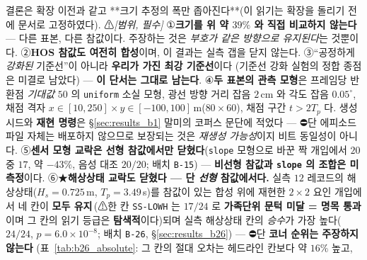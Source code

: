 \documentclass[11pt]{report}
\numberwithin{equation}{chapter}
\numberwithin{figure}{chapter}
\numberwithin{table}{chapter}
\newcommand{\SSLowhNominal}{\,(⚠한 칸 \texttt{SS-LOWH} 는 $17/24$ 로
  \textbf{가족단위 문턱 미달 = 명목 통과}이며 그 칸의 읽기 등급은 \textbf{탐색적}이다)}
\begin{document}
\begin{enumerate}
        결론은 확장 이전과 같고 **크기 추정의 폭만 좁아진다**(이 읽기는 확장을 돌리기 전에
        문서로 고정하였다).
        ⚠\emph{[범위, 필수]} ①\textbf{크기를 위 약 $39\%$ 와 직접 비교하지 않는다} --- 다른 표본,
        다른 참값이다. 주장하는 것은 \emph{부호가 같은 방향으로 유지된다}는 것뿐이다.
        ②\textbf{HOS 참값도 여전히 합성}이며, 이 결과는 실측 갭을 닫지 않는다.
        ③``공정하게 \emph{강화된} 기준선''이 아니라 \textbf{우리가 가진 최강 기준선}이다
        (기준선 강화 실험의 정합 종점은 미결로 남았다) --- \textbf{이 단서는 그대로 남는다}.
        ④\textbf{두 표본의 관측 모형}은 프레임당 반환점 \emph{기대값} $50$ 의
        \texttt{uniform} 소실 모형, 광선 방향 거리 잡음 $2$\,cm 와 각도 잡음 $0.05^\circ$,
        채점 격자 $x\in[10,250]\times y\in[-100,100]$\,m($80\times60$), 채점 구간 $t>2T_p$ 다.
        생성 시드와 \textbf{재현 명령}은 \S\ref{sec:results_b1} 말미의 코퍼스 문단에 적었다
        --- ⛔단 에피소드 파일 자체는 배포하지 않으므로 보장되는 것은 \emph{재생성 가능성}이지
        비트 동일성이 아니다.
        ⑤\textbf{센서 모형 교락은 선형 참값에서만 닫혔다}(\texttt{slope} 모형으로 바꾼 짝
        개입에서 $20$ 중 $17$, 약 $-43\%$, 음성 대조 $20/20$; 배치 \texttt{B-15})
        --- \textbf{비선형 참값과 \texttt{slope} 의 조합은 미측정}이다.
        ⑥★\textbf{해상상태 교락도 닫혔다 --- 단 \emph{선형} 참값에서다.} 실측 $12$
        레코드의 해상상태($H_s = 0.725$\,m, $T_p = 3.49$\,s)를 참값이 있는 합성 위에
        재현한 $2\times2$ 요인 개입에서 네 칸이 \textbf{모두 유지}\SSLowhNominal{}되며 실측 해상상태 칸의
        \emph{승수}가 가장 높다($24/24$, $p = 6.0\times10^{-8}$; 배치 \texttt{B-26},
        \S\ref{sec:results_b26}) --- ⛔단 \textbf{코너 순위는 주장하지 않는다}
        (표~\ref{tab:b26_absolute}: 그 칸의 절대 오차는 헤드라인 칸보다 약 $16\%$ 높고,

\end{enumerate}
\end{document}

